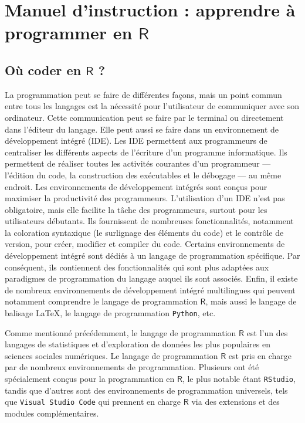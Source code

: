 \documentclass[
  letterpaper,
  DIV=11,
  numbers=noendperiod,
  oneside]{scrreprt}
\begin{document}
\hypertarget{manuel-dinstruction-apprendre-uxe0-programmer-en-textsfr}{%
\section{\texorpdfstring{Manuel d'instruction : apprendre à programmer
en
\(\textsf{R}\)}{Manuel d'instruction : apprendre à programmer en \textbackslash textsf\{R\}}}\label{manuel-dinstruction-apprendre-uxe0-programmer-en-textsfr}}

\hypertarget{ouxf9-coder-en-textsfr}{%
\subsection{\texorpdfstring{Où coder en \(\textsf{R}\)
?}{Où coder en \textbackslash textsf\{R\} ?}}\label{ouxf9-coder-en-textsfr}}

La programmation peut se faire de différentes façons, mais un point
commun entre tous les langages est la nécessité pour l'utilisateur de
communiquer avec son ordinateur. Cette communication peut se faire par
le terminal ou directement dans l'éditeur du langage. Elle peut aussi se
faire dans un environnement de développement intégré (IDE). Les IDE
permettent aux programmeurs de centraliser les différents aspects de
l'écriture d'un programme informatique. Ils permettent de réaliser
toutes les activités courantes d'un programmeur --- l'édition du code,
la construction des exécutables et le débogage --- au même endroit. Les
environnements de développement intégrés sont conçus pour maximiser la
productivité des programmeurs. L'utilisation d'un IDE n'est pas
obligatoire, mais elle facilite la tâche des programmeurs, surtout pour
les utilisateurs débutants. Ils fournissent de nombreuses
fonctionnalités, notamment la coloration syntaxique (le surlignage des
éléments du code) et le contrôle de version, pour créer, modifier et
compiler du code. Certains environnements de développement intégré sont
dédiés à un langage de programmation spécifique. Par conséquent, ils
contiennent des fonctionnalités qui sont plus adaptées aux paradigmes de
programmation du langage auquel ils sont associés. Enfin, il existe de
nombreux environnements de développement intégré multilingues qui
peuvent notamment comprendre le langage de programmation \(\textsf{R}\),
mais aussi le langage de balisage \LaTeX, le langage de programmation
\texttt{Python}, etc.

Comme mentionné précédemment, le langage de programmation \(\textsf{R}\)
est l'un des langages de statistiques et d'exploration de données les
plus populaires en sciences sociales numériques. Le langage de
programmation \(\textsf{R}\) est pris en charge par de nombreux
environnements de programmation. Plusieurs ont été spécialement conçus
pour la programmation en \(\textsf{R}\), le plus notable étant
\texttt{RStudio}, tandis que d'autres sont des environnements de
programmation universels, tels que \texttt{Visual\ Studio\ Code} qui
prennent en charge \(\textsf{R}\) via des extensions et des modules
complémentaires.
\end{document}
